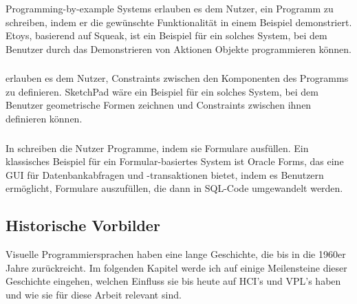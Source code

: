 \documentclass[ngerman]{article}
\begin{document}
\subsubsection{}
Programming-by-example Systems erlauben es dem Nutzer, ein Programm zu schreiben, indem er die gewünschte Funktionalität in einem Beispiel demonstriert. Etoys, basierend auf Squeak, ist ein Beispiel für ein solches System, bei dem Benutzer durch das Demonstrieren von Aktionen Objekte programmieren können. \cite{squeakSqueakSmalltalk}

\subsubsection{}
 erlauben es dem Nutzer, Constraints zwischen den Komponenten des Programms zu definieren. SketchPad wäre ein Beispiel für ein solches System, bei dem Benutzer geometrische Formen zeichnen und Constraints zwischen ihnen definieren können. \cite{sutherlandSketchpad}

\subsubsection{}
In  schreiben die Nutzer Programme, indem sie Formulare ausfüllen. 
Ein klassisches Beispiel für ein Formular-basiertes System ist Oracle Forms, 
das eine GUI für Datenbankabfragen und -transaktionen bietet, indem es Benutzern ermöglicht, Formulare auszufüllen, die dann in SQL-Code umgewandelt werden. \cite{wikipediaOracleForms}

\subsection{Historische Vorbilder}

Visuelle Programmiersprachen haben eine lange Geschichte, die bis in die 1960er Jahre zurückreicht. Im folgenden Kapitel werde ich auf einige Meilensteine dieser Geschichte eingehen, welchen Einfluss sie bis heute auf HCI's und VPL's haben und wie sie für diese Arbeit relevant sind.
\end{document}
